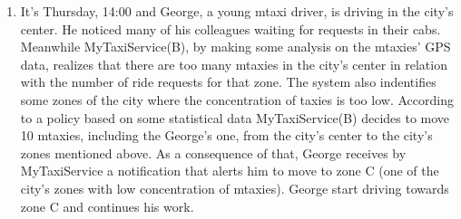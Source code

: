 \documentclass[11pt]{article} %
\begin{document}
\begin{enumerate}
	    \item It's Thursday, 14:00 and George, a young mtaxi driver, is driving in the city's center.
	       He noticed many of his colleagues waiting for requests in their cabs.
	       Meanwhile MyTaxiService(B), by making some analysis on the mtaxies' GPS data, realizes that there are too many mtaxies
	       in the city's center in relation with the number of ride requests for that zone. The system also indentifies
	       some zones of the city where the concentration of taxies is too low. According to a policy based on some statistical data
	       MyTaxiService(B) decides to move 10 mtaxies, including the George's one, from the city's center to the city's zones mentioned above.
	       As a consequence of that, George receives by MyTaxiService a notification that alerts him to move to zone C (one of the city's zones
	       with low concentration of mtaxies). George start driving towards zone C and continues his work.
	\end{enumerate}
\end{document}

